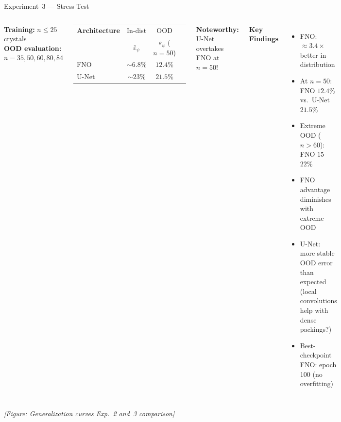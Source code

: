 \documentclass[aspectratio=169, 10pt]{beamer}
\begin{document}
\begin{frame}{Experiment~3 — Stress Test}
  \begin{columns}[T]
      \textbf{Training:} $n \leq 25$ crystals\\
      \textbf{OOD evaluation:} $n = 35, 50, 60, 80, 84$

      \vspace{0.5em}
      \begin{center}
      \small
      \begin{tabular}{lccc}
        \toprule
        \textbf{Architecture} & In-dist & OOD\\
                               & $\bar{\varepsilon}_\psi$ & $\bar{\varepsilon}_\psi$ ($n=50$) \\
        \midrule
        \textcolor{fnocolor}{FNO}    & ${\sim}6.8\%$  & $12.4\%$ \\
        \textcolor{unetcolor}{U-Net}  & ${\sim}23\%$   & $21.5\%$ \\
        \bottomrule
      \end{tabular}
      \end{center}

      \vspace{0.5em}
      \textbf{Noteworthy:} U-Net overtakes FNO at $n=50$!

      \textbf{Key Findings}
      \begin{itemize}
        \item FNO: ${\approx}3.4\times$ better in-distribution
        \item At $n=50$: FNO $12.4\%$ vs.\ U-Net $21.5\%$
        \item Extreme OOD ($n > 60$): FNO $15$–$22\%$
        \item FNO advantage diminishes with extreme OOD
        \item U-Net: more stable OOD error than expected\\
          (local convolutions help with dense packings?)
        \item Best-checkpoint FNO: epoch 100 (no overfitting)
      \end{itemize}
  \end{columns}

  \vspace{0.3em}
  \begin{center}
    \small\textit{[Figure: Generalization curves Exp.~2 and~3 comparison]}\\
  \end{center}
\end{frame}
\end{document}
